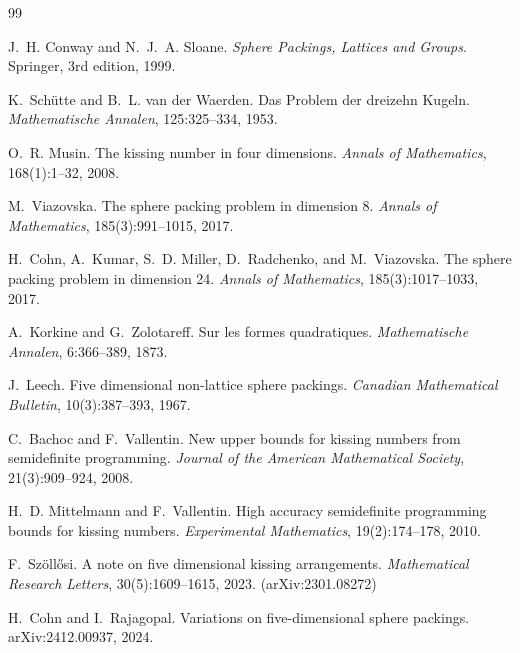 \documentclass[11pt]{article}
\begin{document}
\begin{thebibliography}{99}

J.~H. Conway and N.~J.~A. Sloane.
\newblock \emph{Sphere Packings, Lattices and Groups}.
\newblock Springer, 3rd edition, 1999.

K.~Sch\"{u}tte and B.~L. van der Waerden.
\newblock Das Problem der dreizehn Kugeln.
\newblock \emph{Mathematische Annalen}, 125:325--334, 1953.

O.~R. Musin.
\newblock The kissing number in four dimensions.
\newblock \emph{Annals of Mathematics}, 168(1):1--32, 2008.

M.~Viazovska.
\newblock The sphere packing problem in dimension 8.
\newblock \emph{Annals of Mathematics}, 185(3):991--1015, 2017.

H.~Cohn, A.~Kumar, S.~D. Miller, D.~Radchenko, and M.~Viazovska.
\newblock The sphere packing problem in dimension 24.
\newblock \emph{Annals of Mathematics}, 185(3):1017--1033, 2017.

A.~Korkine and G.~Zolotareff.
\newblock Sur les formes quadratiques.
\newblock \emph{Mathematische Annalen}, 6:366--389, 1873.

J.~Leech.
\newblock Five dimensional non-lattice sphere packings.
\newblock \emph{Canadian Mathematical Bulletin}, 10(3):387--393, 1967.

C.~Bachoc and F.~Vallentin.
\newblock New upper bounds for kissing numbers from semidefinite programming.
\newblock \emph{Journal of the American Mathematical Society}, 21(3):909--924, 2008.

H.~D. Mittelmann and F.~Vallentin.
\newblock High accuracy semidefinite programming bounds for kissing numbers.
\newblock \emph{Experimental Mathematics}, 19(2):174--178, 2010.

F.~Sz\"{o}ll\H{o}si.
\newblock A note on five dimensional kissing arrangements.
\newblock \emph{Mathematical Research Letters}, 30(5):1609--1615, 2023.
\newblock (arXiv:2301.08272)

H.~Cohn and I.~Rajagopal.
\newblock Variations on five-dimensional sphere packings.
\newblock arXiv:2412.00937, 2024.

\end{thebibliography}
\end{document}
